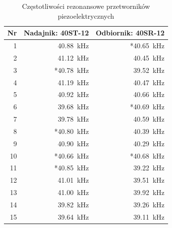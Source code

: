 \begin{table}[t]
  \centering
  \begin{tabular}{|r|r|r|}
    \hline 
    Nr & Nadajnik: 40ST-12 & Odbiornik: 40SR-12\\
    \hline
    1  &   \SI{40,88}{kHz} & *\SI{40,65}{kHz} \\
    2  &   \SI{41,12}{kHz} &  \SI{40,45}{kHz} \\
    3  &  *\SI{40,78}{kHz} &  \SI{39,52}{kHz} \\
    4  &   \SI{41,19}{kHz} &  \SI{40,47}{kHz} \\
    5  &   \SI{40,92}{kHz} &  \SI{40,66}{kHz} \\
    6  &   \SI{39,68}{kHz} & *\SI{40,69}{kHz} \\
    7  &   \SI{39,78}{kHz} &  \SI{40,59}{kHz} \\
    8  &  *\SI{40,80}{kHz} &  \SI{40,39}{kHz} \\
    9  &   \SI{40,90}{kHz} &  \SI{40,29}{kHz} \\
    10 &  *\SI{40,66}{kHz} & *\SI{40,68}{kHz} \\
    11 &  *\SI{40,85}{kHz} &  \SI{39,22}{kHz} \\
    12 &   \SI{41,01}{kHz} &  \SI{39,51}{kHz} \\
    13 &   \SI{41,00}{kHz} &  \SI{39,92}{kHz} \\
    14 &   \SI{39,82}{kHz} &  \SI{39,26}{kHz} \\
    15 &   \SI{39,64}{kHz} &  \SI{39,11}{kHz} \\
    \hline
  \end{tabular}
  \caption{Częstotliwości rezonansowe przetworników piezoelektrycznych}
  \label{table:czestotliwosci}
\end{table}


